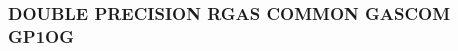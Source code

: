 \hypertarget{pfcgas_8com_a2d7ad8a7f43069a14c265ff78370b1dd}{
\subsubsection[{G\-P1\-O\-G}]{\setlength{\rightskip}{0pt plus 5cm}D\-O\-U\-B\-L\-E P\-R\-E\-C\-I\-S\-I\-O\-N R\-G\-A\-S C\-O\-M\-M\-O\-N G\-A\-S\-C\-O\-M G\-P1\-O\-G}}\label{pfcgas_8com_a2d7ad8a7f43069a14c265ff78370b1dd}
